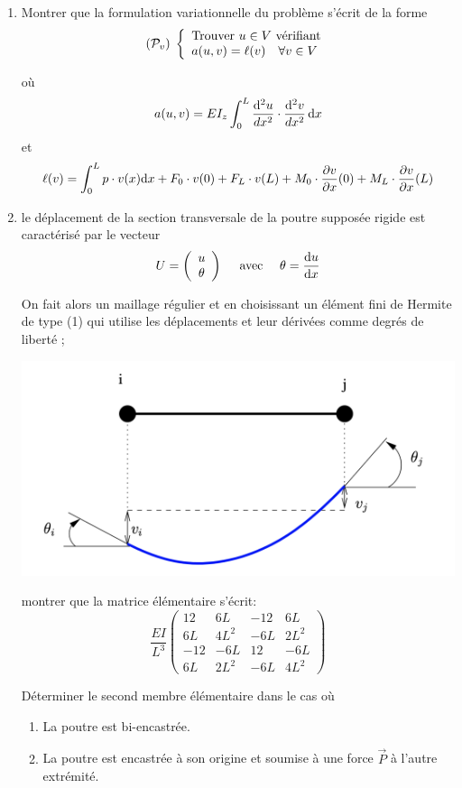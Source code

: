 \documentclass{article}
\def \de {{\rm d}}
\begin{document}
\begin{enumerate}
\item Montrer que la formulation variationnelle du problème s'écrit de la forme
\[
({\cal P}_v)\;\left\{
\begin{array}{l}
\mbox{Trouver } u\in V \mbox{ vérifiant}\\
a(u,v)=\ell(v)\quad \forall v\in V
\end{array}
\right.
\]

où \[ a(u,v)=\displaystyle EI_z\int_0^L\frac{\de^2 u}{dx^2}\cdot \frac{\de^2 v}{dx^2}\,\de x\]
et \[ \ell(v)=\displaystyle \int_0^L p\cdot v(x)\de x+F_0 \cdot v(0)+F_L \cdot v(L)+M_0 \cdot \frac{\partial v}{\partial x}(0)+M_L \cdot \frac{\partial v}{\partial x}(L)\]
\item le déplacement de la section transversale de la poutre supposée rigide est caractérisé par le vecteur \[U=\left(\begin{array}{c}
u\\\theta
\end{array} \right)\quad \mbox{ avec }\quad \theta=\displaystyle \frac{\de u}{\de x}\]

On fait alors un maillage régulier et en choisissant un élément fini de Hermite de type (1) qui utilise les déplacements et leur dérivées comme degrés de liberté ;
\begin{center}
\includegraphics[scale=0.3]{poutreEnFlexion.png} 
\end{center}

 montrer que la matrice élémentaire s'écrit:
\[\frac{EI}{L^3}\left(\begin{array}{rrrr} 
12&6L&-12&6L\\
6L&4L^2&-6L&2L^2\\
-12&-6L&12&-6L\\
6L&2L^2&-6L&4L^2
\end{array}\right) 
\]

Déterminer le second membre élémentaire dans le cas où 
\begin{enumerate}
\item La poutre est bi-encastrée.
\item La poutre est encastrée à son origine et soumise à une force $\vec{P}$ à l'autre extrémité.
\end{enumerate}



\end{enumerate}
 
 
\end{document}
